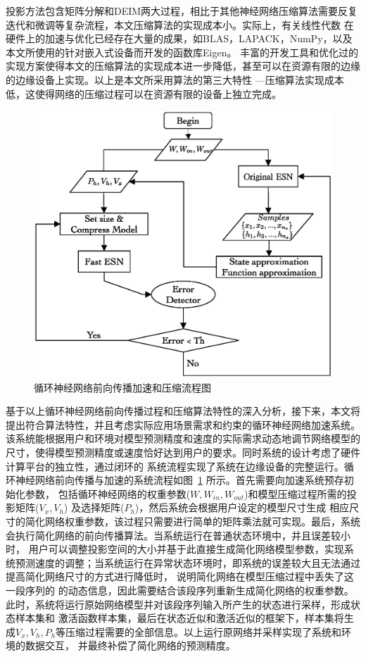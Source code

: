 投影方法包含矩阵分解和DEIM两大过程，相比于其他神经网络压缩算法需要反复迭代和微调等复杂流程，本文压缩算法的实现成本小。实际上，有关线性代数
在硬件上的加速与优化已经存在大量的成果，如BLAS，LAPACK，NumPy，以及本文所使用的针对嵌入式设备而开发的函数库Eigen。
丰富的开发工具和优化过的实现方案使得本文的压缩算法的实现成本进一步降低，甚至可以在资源有限的边缘的边缘设备上实现。以上是本文所采用算法的第三大特性
---压缩算法实现成本低，这使得网络的压缩过程可以在资源有限的设备上独立完成。
\begin{figure}
	\centering
	\includegraphics[width=0.6\columnwidth]{exp/Flowchart_diagram.eps}
	\caption{循环神经网络前向传播加速和压缩流程图}
	\label{fig:flowchart}
\end{figure}

基于以上循环神经网络前向传播过程和压缩算法特性的深入分析，接下来，本文将提出符合算法特性，并且考虑实际应用场景需求和约束的循环神经网络加速系统。
该系统能根据用户和环境对模型预测精度和速度的实际需求动态地调节网络模型的尺寸，使得模型预测精度或速度恰好达到用户的要求。同时系统的设计考虑了硬件计算平台的独立性，通过闭环的
系统流程实现了系统在边缘设备的完整运行。循环神经网络前向传播与加速的系统流程如图~\ref{fig:flowchart} 所示。首先需要向加速系统预存初始化参数，
包括循环神经网络的权重参数(\(W,W_{in},W_{out}\))和模型压缩过程所需的投影矩阵(\(V_x,V_h\)) 及选择矩阵(\(P_h\))，然后系统会根据用户设定的模型尺寸生成
相应尺寸的简化网络权重参数，该过程只需要进行简单的矩阵乘法就可实现。最后，系统会执行简化网络的前向传播算法。当系统运行在普通状态环境中，并且误差较小时，
用户可以调整投影空间的大小并基于此直接生成简化网络模型参数，实现系统预测速度的调整；当系统运行在异常状态环境时，即系统的误差较大且无法通过提高简化网络尺寸的方式进行降低时，
说明简化网络在模型压缩过程中丢失了这一段序列的
的动态信息，因此需要结合该段序列重新生成简化网络的权重参数。此时，系统将运行原始网络模型并对该段序列输入所产生的状态进行采样，形成状态样本集和
激活函数样本集，最后在状态近似和激活近似的框架下，样本集将生成\(V_x,V_h,P_h\)等压缩过程需要的全部信息。以上运行原网络并采样实现了系统和环境的数据交互，
并最终补偿了简化网络的预测精度。
